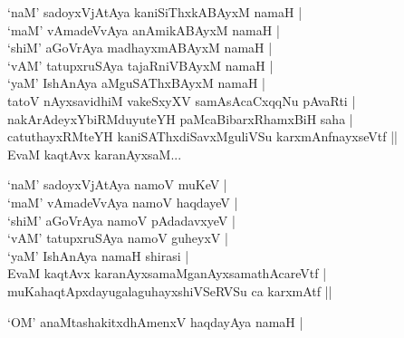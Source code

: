\begin{entry}
\medskip
\begin{shl}
`naM' sadoyxVjAtAya kaniSiThxkABAyxM namaH |\\[1pt]
`maM' vAmadeVvAya anAmikABAyxM namaH |\\[1pt]
`shiM' aGoVrAya madhayxmABAyxM namaH |\\[1pt]
`vAM' tatupxruSAya tajaRniVBAyxM namaH |\\[1pt]
`yaM' IshAnAya aMguSAThxBAyxM namaH |\\[1pt]
tatoV nAyxsavidhiM vakeSxyXV samAsAcaCxqqNu pAvaRti |\\[1pt]
nakArAdeyxYbiRMduyuteYH paMcaBibarxRhamxBiH saha |\\[1pt]
catuthayxRMteYH kaniSAThxdiSavxMguliVSu karxmAnfnayxseVtf ||\\[1pt]
EvaM kaqtAvx karanAyxsaM...
\end{shl}
\medskip
{}
\medskip
{}
\medskip
\begin{shl}
`naM' sadoyxVjAtAya namoV muKeV |\\[1pt]
`maM' vAmadeVvAya namoV haqdayeV |\\[1pt]
`shiM' aGoVrAya namoV pAdadavxyeV |\\[1pt]
`vAM' tatupxruSAya namoV guheyxV |\\[1pt]
`yaM' IshAnAya namaH shirasi |\\[1pt]
EvaM kaqtAvx karanAyxsamaMganAyxsamathAcareVtf |\\[1pt]
muKahaqtApxdayugalaguhayxshiVSeRVSu ca karxmAtf ||
\end{shl}
\medskip
{}
\medskip
{}
\medskip
\begin{shl}
`OM' anaMtashakitxdhAmenxV haqdayAya namaH |\\[1pt]

\end{shl}
\end{entry}
